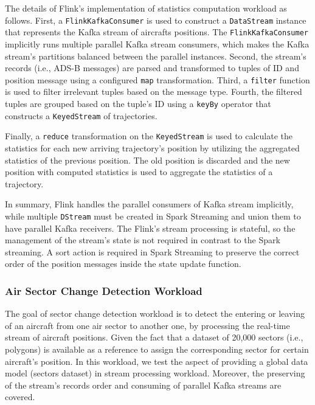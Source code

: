 \documentclass[]{article}
\begin{document}
\begin{itemize}
The details of Flink's implementation of statistics computation workload as follows. First, a \texttt{FlinkKafkaConsumer} is used to  construct a \texttt{DataStream} instance that represents the Kafka stream of aircrafts positions. The  \texttt{FlinkKafkaConsumer} implicitly runs multiple parallel Kafka stream consumers, which makes the Kafka stream's partitions balanced between the parallel instances. Second, the stream's records (i.e., ADS-B messages) are parsed and transformed to tuples of ID and position message using a configured \texttt{map} transformation. Third, a \texttt{filter} function is used to filter irrelevant tuples based on the message type. Fourth, the filtered tuples  are grouped based on the tuple's ID using a \texttt{keyBy} operator that constructs a \texttt{KeyedStream} of trajectories.\par Finally, 
a \texttt{reduce} transformation on the  \texttt{KeyedStream} is used to calculate the statistics for each new arriving trajectory's position by utilizing the aggregated statistics of the previous position. The old position is discarded and the new position with computed statistics is used to aggregate the statistics of a trajectory.

\end{itemize}

\par In summary, Flink  handles  the parallel consumers of Kafka stream implicitly, while multiple \texttt{DStream} must be created in Spark Streaming and union them to have parallel Kafka receivers. The Flink's stream processing is stateful, so  the  management of the stream's state is not required in contrast to the Spark streaming. A sort action is required in Spark Streaming to preserve the correct  order of the position messages inside the state update function.

\subsubsection{Air Sector Change Detection Workload}
\label{sec:sectors}
The goal of sector change detection workload is to detect the  entering or leaving of an aircraft from one air sector to another one, by processing the real-time stream of aircraft positions. Given the fact that a dataset of 20,000 sectors (i.e., polygons) is available as a reference to assign the corresponding sector for certain aircraft's position. In this workload, we test the aspect of providing a global data model (sectors dataset) in stream processing workload. Moreover, the preserving of the stream's records order and consuming of parallel Kafka streams  are covered.
 
\end{document}
